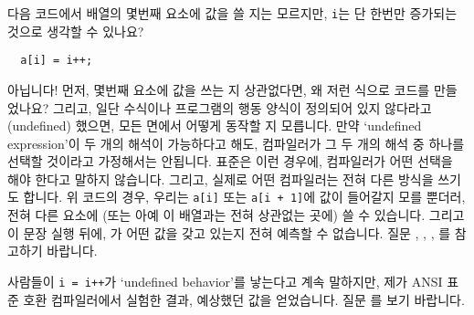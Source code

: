\begin{faq}
	다음 코드에서 배열의 몇번째 요소에 값을 쓸 지는 모르지만,
	\verb+i+는 단 한번만 증가되는 것으로 생각할 수 있나요?

\begin{verbatim}
  a[i] = i++;
\end{verbatim}

\A
	아닙니다! 먼저, 몇번째 요소에 값을 쓰는 지 상관없다면, 왜 저런 식으로
        코드를 만들었나요? 그리고, 일단 수식이나 프로그램의 행동 양식이 정의되어 있지
	않다라고 (undefined) 했으면, 모든 면에서 어떻게 동작할 지 모릅니다.
        만약 `undefined expression'이 두 개의 해석이 가능하다고 해도, 
        컴파일러가 그 두 개의 해석 중 하나를 선택할 것이라고 가정해서는 안됩니다.
        표준은 이런 경우에, 컴파일러가 어떤 선택을 해야 한다고 말하지 않습니다.
        그리고, 실제로 어떤 컴파일러는 전혀 다른 방식을 쓰기도 합니다.
        위 코드의 경우, 우리는 \verb+a[i]+ 또는 \verb?a[i + 1]?에 값이
        들어갈지 모를 뿐더러, 전혀 다른 요소에 (또는 아예 이 배열과는 전혀 상관없는
        곳에) 쓸 수 있습니다. 그리고 이 문장 실행 뒤에, 가 어떤 값을 갖고 있는지
        전혀 예측할 수 없습니다. 
	질문 , , , 를 참고하기 바랍니다.
\end{faq}

\begin{faq}
        사람들이 \verb|i = i++|가 `undefined behavior'를 낳는다고 계속 말하지만,
        제가 ANSI 표준 호환 컴파일러에서 실험한 결과, 예상했던 값을 얻었습니다.
\A
        질문 를 보기 바랍니다.
\end{faq}

